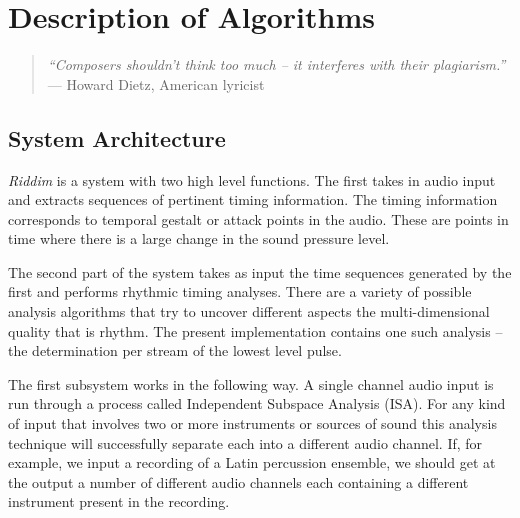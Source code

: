 \chapter{Description of Algorithms}
\vspace{10mm}

\begin{quote}
  {\it ``Composers shouldn't think too much -- it interferes with their
    plagiarism.''} --- Howard Dietz, American lyricist
\end{quote}

\vspace{7mm}
\section{System Architecture} 
\vspace{5mm}

{\it Riddim} is a system with two high level functions.  
The first takes in audio input and extracts sequences of pertinent 
timing information.  The timing information corresponds to temporal 
gestalt or attack points in the audio. These are points in time 
where there is a large change in the sound pressure level.

The second part of the system takes as input the time sequences 
generated by the first and performs rhythmic timing analyses. 
There are a variety of possible analysis algorithms that try to 
uncover different aspects the multi-dimensional quality that is 
rhythm. The present implementation contains one such analysis -- the
determination per stream of the lowest level pulse. 

The first subsystem works in the following way. A single channel 
audio input is run through a process called Independent Subspace 
Analysis (ISA). For any kind of input that involves two or more instruments or 
sources of sound this analysis technique will successfully separate
each into a different audio channel.  If, for example, we input a
recording of a Latin percussion ensemble, we should get at the output 
a number of different audio channels each containing a different 
instrument present in the recording.

